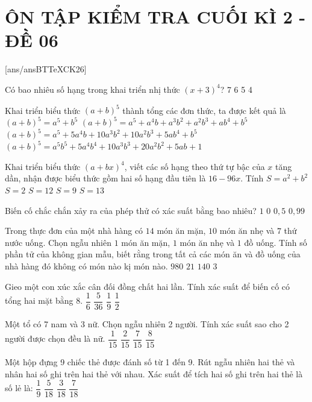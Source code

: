 \section*{ÔN TẬP KIỂM TRA CUỐI KÌ 2 - ĐỀ 06}
\setcounter{ex}{0}\setcounter{bt}{0}
[ans/ansBTTeXCK26]
\begin{ex}
Có bao nhiêu số hạng trong khai triển nhị thức $(x+3)^4$?
\choice
{7}
{6}
{5}
{4}
\end{ex}
\begin{ex}
Khai triển biểu thức ${{(a+b)}^5}$ thành tổng các đơn thức, ta được kết quả là
\choice
{${{(a+b)}^5}=a^5+b^5$}
{${{(a+b)}^5}=a^5+a^4b+a^3b^2+a^2b^3+ab^4+b^5$}
{${{(a+b)}^5}=a^5+5a^4b+10a^3b^2+10a^2b^3+5ab^4+b^5$}
{${{(a+b)}^5}=a^5b^5+5a^4b^4+10a^3b^3+20a^2b^2+5ab^{}+1$}
\end{ex}
\begin{ex}
Khai triển biểu thức ${{(a+bx)}^4}$, viết các số hạng theo thứ tự bậc của $x$ tăng dần, nhận được biểu thức gồm hai số hạng đầu tiên là $16-96x$. Tính $S=a^2+b^2$
\choice
{$S=2$}
{$S=12$}
{$S=9$}
{$S=13$}
\end{ex}
\begin{ex}
Biến cố chắc chắn xảy ra của phép thử có xác suất bằng bao nhiêu?
\choice
{$1$}
{$0$}
{$0{,}5$}
{$0{,}99$}
\end{ex}
\begin{ex}
Trong thực đơn của một nhà hàng có $14$ món ăn mặn, $10$ món ăn nhẹ và $7$ thứ nước uống. Chọn ngẫu nhiên $1$ món ăn mặn, $1$ món ăn nhẹ và $1$ đồ uống. Tính số phần tử của không gian mẫu, biết rằng trong tất cả các món ăn và đồ uống của nhà hàng đó không có món nào kị món nào.
\choice
{$980$}
{$21$}
{$140$}
{$3$}
\end{ex}
\begin{ex}
Gieo một con xúc xắc cân đối đồng chất hai lần. Tính xác suất để biến cố có tổng hai mặt bằng 8.
\choice
{$\dfrac{1}{6}$}
{$\dfrac{5}{36}$}
{$\dfrac{1}{9}$}
{$\dfrac{1}{2}$}
\end{ex}
\begin{ex}
Một tổ có 7 nam và 3 nữ. Chọn ngẫu nhiên 2 người. Tính xác suất sao cho 2 người được chọn đều là nữ.
\choice
{$\dfrac{1}{15}$}
{$\dfrac{2}{15}$}
{$\dfrac{7}{15}$}
{$\dfrac{8}{15}$}
\end{ex}
\begin{ex}
Một hộp đựng 9 chiếc thẻ được đánh số từ 1 đến 9. Rút ngẫu nhiên hai thẻ và nhân hai số ghi trên hai thẻ với nhau. Xác suất để tích hai số ghi trên hai thẻ là số lẻ là:
\choice
{${\dfrac{1}{9}}$}
{${\dfrac{5}{18}}$}
{${\dfrac{3}{18}}$}
{${\dfrac{7}{18}}$}
\end{ex}
